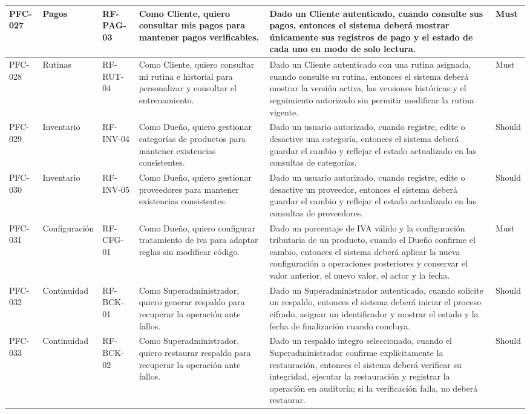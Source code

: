 \begin{landscape}
\begin{longtable}{|p{1.6cm}|p{2cm}|p{2.2cm}|p{7.2cm}|p{5.5cm}|p{1.8cm}|}
PFC-027 & Pagos & RF-PAG-03 & Como Cliente, quiero consultar mis pagos para mantener pagos verificables. & Dado un Cliente autenticado, cuando consulte sus pagos, entonces el sistema deberá mostrar únicamente sus registros de pago y el estado de cada uno en modo de solo lectura. & Must \\ \hline
PFC-028 & Rutinas & RF-RUT-04 & Como Cliente, quiero consultar mi rutina e historial para personalizar y consultar el entrenamiento. & Dado un Cliente autenticado con una rutina asignada, cuando consulte su rutina, entonces el sistema deberá mostrar la versión activa, las versiones históricas y el seguimiento autorizado sin permitir modificar la rutina vigente. & Must \\ \hline
PFC-029 & Inventario & RF-INV-04 & Como Dueño, quiero gestionar categorías de productos para mantener existencias consistentes. & Dado un usuario autorizado, cuando registre, edite o desactive una categoría, entonces el sistema deberá guardar el cambio y reflejar el estado actualizado en las consultas de categorías. & Should \\ \hline
PFC-030 & Inventario & RF-INV-05 & Como Dueño, quiero gestionar proveedores para mantener existencias consistentes. & Dado un usuario autorizado, cuando registre, edite o desactive un proveedor, entonces el sistema deberá guardar el cambio y reflejar el estado actualizado en las consultas de proveedores. & Should \\ \hline
PFC-031 & Configuración & RF-CFG-01 & Como Dueño, quiero configurar tratamiento de iva para adaptar reglas sin modificar código. & Dado un porcentaje de IVA válido y la configuración tributaria de un producto, cuando el Dueño confirme el cambio, entonces el sistema deberá aplicar la nueva configuración a operaciones posteriores y conservar el valor anterior, el nuevo valor, el actor y la fecha. & Must \\ \hline
PFC-032 & Continuidad & RF-BCK-01 & Como Superadministrador, quiero generar respaldo para recuperar la operación ante fallos. & Dado un Superadministrador autenticado, cuando solicite un respaldo, entonces el sistema deberá iniciar el proceso cifrado, asignar un identificador y mostrar el estado y la fecha de finalización cuando concluya. & Should \\ \hline
PFC-033 & Continuidad & RF-BCK-02 & Como Superadministrador, quiero restaurar respaldo para recuperar la operación ante fallos. & Dado un respaldo íntegro seleccionado, cuando el Superadministrador confirme explícitamente la restauración, entonces el sistema deberá verificar su integridad, ejecutar la restauración y registrar la operación en auditoría; si la verificación falla, no deberá restaurar. & Should \\ \hline

\end{longtable}
\end{landscape}
